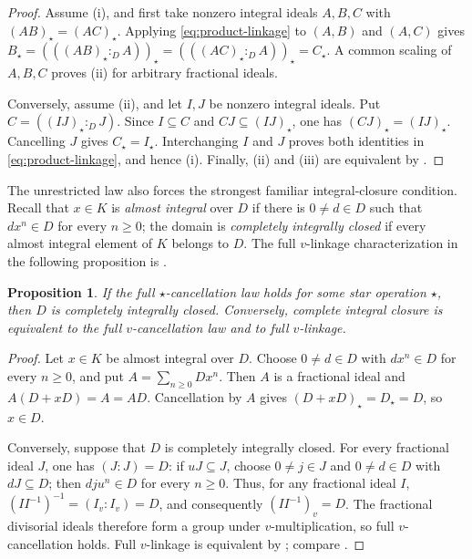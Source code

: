 \documentclass[11pt]{amsart}
\newtheorem{proposition}[proposition]{Proposition}
\theoremstyle{definition}
\theoremstyle{remark}
\begin{document}
\begin{proof}
Assume (i), and first take nonzero integral ideals $A,B,C$ with
$(AB)_\star=(AC)_\star$.  Applying \eqref{eq:product-linkage} to $(A,B)$
and $(A,C)$ gives
$B_\star=(((AB)_\star:_D A))_\star
        =(((AC)_\star:_D A))_\star=C_\star$.
A common scaling of $A,B,C$ proves (ii) for arbitrary fractional ideals.

Conversely, assume (ii), and let $I,J$ be nonzero integral ideals.  Put
$C=((IJ)_\star:_D J)$.  Since $I\subseteq C$ and
$CJ\subseteq(IJ)_\star$, one has $(CJ)_\star=(IJ)_\star$.  Cancelling $J$
gives $C_\star=I_\star$.  Interchanging $I$ and $J$ proves both identities
in \eqref{eq:product-linkage}, and hence (i).  Finally, (ii) and (iii) are
equivalent by .
\end{proof}

The unrestricted law also forces the strongest familiar integral-closure
condition.  Recall that $x\in K$ is \emph{almost integral} over $D$ if there
is $0\ne d\in D$ such that $dx^n\in D$ for every $n\geq0$; the domain is
\emph{completely integrally closed} if every almost integral element of $K$
belongs to $D$.  The full $v$-linkage characterization in the following
proposition is \cite[Theorem~3.2]{KabbajMimouniStar}.

\begin{proposition}\label{prop:CIC}
If the full $\star$-cancellation law holds for some star operation $\star$,
then $D$ is completely integrally closed.  Conversely, complete integral
closure is equivalent to the full $v$-cancellation law and to full
$v$-linkage.
\end{proposition}

\begin{proof}
Let $x\in K$ be almost integral over $D$.  Choose $0\ne d\in D$ with
$dx^n\in D$ for every $n\geq0$, and put $A=\sum_{n\geq0}Dx^n$.  Then $A$ is
a fractional ideal and $A(D+xD)=A=AD$.  Cancellation by $A$ gives
$(D+xD)_\star=D_\star=D$, so $x\in D$.

Conversely, suppose that $D$ is completely integrally closed.  For every
fractional ideal $J$, one has $(J:J)=D$: if $uJ\subseteq J$, choose
$0\ne j\in J$ and $0\ne d\in D$ with $dJ\subseteq D$; then
$dju^n\in D$ for every $n\geq0$.  Thus, for any fractional ideal $I$,
$(II^{-1})^{-1}=(I_v:I_v)=D$, and consequently $(II^{-1})_v=D$.
The fractional divisorial ideals therefore form a group under
$v$-multiplication, so full $v$-cancellation holds.  Full $v$-linkage is
equivalent by ; compare \cite{GilmerBook}.
\end{proof}
\end{document}
